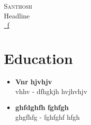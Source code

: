 \documentclass[letterpaper,5pt]{article}
\begin{document}
    

    
    \begin{center}
        {\Huge \scshape Santhosh} \\ \vspace{1pt}
        \large Headline \\ \vspace{1pt}
        \href{mailto:f}{\raisebox{-0.05\height}\faEnvelope \ f} 
         \
         \
         \  
        \vspace{-8pt}
    \end{center}
    
    
      \section{\textbf{Education}}
      
          \begin{itemize}[leftmargin=0in, label={}]
          \item
            \textbf{Vnr} \hfill \textbf{hjvhjv} \\
            vhhv - dfhgkjh \hfill hvjhvhjv
            \vspace*{-3mm}
          \end{itemize}
        
          \begin{itemize}[leftmargin=0in, label={}]
          \item
            \textbf{ghfdghfh} \hfill \textbf{fghfgh} \\
            ghgfhfg - fghfghf \hfill hfgh
            \vspace*{-3mm}
          \end{itemize}
        
        \vspace{3mm}
    
    
    
    \vspace*{-5mm}

    
    
\end{document}
